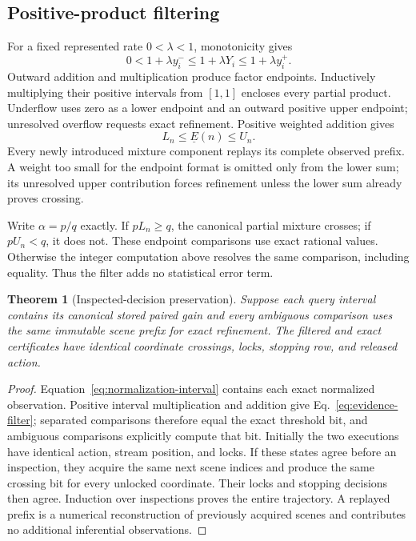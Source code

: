 \documentclass[11pt]{article}
\newtheorem{theorem}{Theorem}
\begin{document}
\subsection{Positive-product filtering}
For a fixed represented rate $0<\lambda<1$, monotonicity gives
\begin{equation}
0<1+\lambda y_i^-\le1+\lambda Y_i\le1+\lambda y_i^+.
\end{equation}
Outward addition and multiplication produce factor endpoints. Inductively multiplying their positive intervals from $[1,1]$ encloses every partial product. Underflow uses zero as a lower endpoint and an outward positive upper endpoint; unresolved overflow requests exact refinement. Positive weighted addition gives
\begin{equation}
L_n\le\underline E(n)\le U_n.
\label{eq:evidence-filter}
\end{equation}
Every newly introduced mixture component replays its complete observed prefix. A weight too small for the endpoint format is omitted only from the lower sum; its unresolved upper contribution forces refinement unless the lower sum already proves crossing.

Write $\alpha=p/q$ exactly. If $pL_n\ge q$, the canonical partial mixture crosses; if $pU_n<q$, it does not. These endpoint comparisons use exact rational values. Otherwise the integer computation above resolves the same comparison, including equality. Thus the filter adds no statistical error term.

\begin{theorem}[Inspected-decision preservation]\label{thm:evidence-exact}
Suppose each query interval contains its canonical stored paired gain and every ambiguous comparison uses the same immutable scene prefix for exact refinement. The filtered and exact certificates have identical coordinate crossings, locks, stopping row, and released action.
\end{theorem}
\begin{proof}
Equation~\eqref{eq:normalization-interval} contains each exact normalized observation. Positive interval multiplication and addition give Eq.~\eqref{eq:evidence-filter}; separated comparisons therefore equal the exact threshold bit, and ambiguous comparisons explicitly compute that bit. Initially the two executions have identical action, stream position, and locks. If these states agree before an inspection, they acquire the same next scene indices and produce the same crossing bit for every unlocked coordinate. Their locks and stopping decisions then agree. Induction over inspections proves the entire trajectory. A replayed prefix is a numerical reconstruction of previously acquired scenes and contributes no additional inferential observations.
\end{proof}
\end{document}
